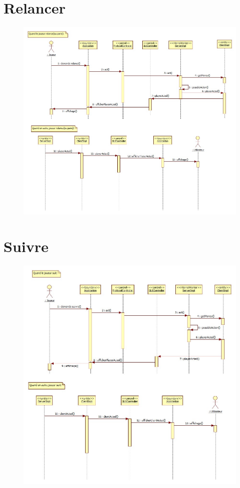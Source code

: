 \section{Relancer}
\begin{figure}[ht]
	\centering \includegraphics[angle=90, width=\linewidth]{figures/DetailedRaiseSequenceDiagram.jpg}
\end{figure}
\clearpage
\section{Suivre}
\begin{figure}[ht]
	\centering \includegraphics[angle=90, width=\linewidth]{figures/DetailedCallingSequenceDiagram.jpg}
\end{figure}
\clearpage
